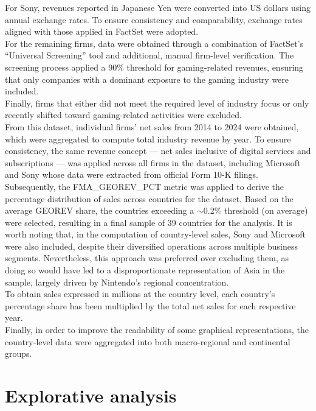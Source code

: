 For Sony, revenues reported in Japanese Yen were converted into US dollars using annual exchange rates. To ensure consistency and comparability, exchange rates aligned with those applied in FactSet were adopted.\\
For the remaining firms, data were obtained through a combination of FactSet’s “Universal Screening” tool and additional, manual firm-level verification. The screening process applied a 90\% threshold for gaming-related revenues, ensuring that only companies with a dominant exposure to the gaming industry were included.\\
Finally, firms that either did not meet the required level of industry focus or only recently shifted toward gaming-related activities were excluded.\\
From this dataset, individual firms’ net sales from 2014 to 2024 were obtained, which were aggregated to compute total industry revenue by year. To ensure consistency, 
the same revenue concept — net sales inclusive of digital 
services and subscriptions — was applied across all firms 
in the dataset, including Microsoft and Sony whose data 
were extracted from official Form 10-K filings.\\
Subsequently, the FMA\_GEOREV\_PCT metric was applied to derive the percentage distribution of sales across countries for the dataset. Based on the average GEOREV share, the countries exceeding a $\sim$0.2\% threshold (on average) were selected, resulting in a final sample of 39 countries for the analysis. It is worth noting that, in the computation of country-level sales, Sony and Microsoft were also included, despite their diversified operations across multiple business segments. Nevertheless, this approach was preferred over excluding them, as doing so would have led to a disproportionate representation of Asia in the sample, largely driven by Nintendo’s regional concentration.\\
To obtain sales expressed in millions at the country level, each country’s percentage share has been multiplied by the total net sales for each respective year.\\
Finally, in order to improve the readability of some graphical representations, the country-level data were aggregated into both macro-regional and continental groups.


\section{Explorative analysis}

